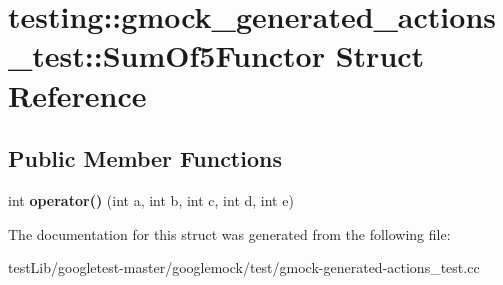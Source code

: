 \hypertarget{structtesting_1_1gmock__generated__actions__test_1_1SumOf5Functor}{}\section{testing\+:\+:gmock\+\_\+generated\+\_\+actions\+\_\+test\+:\+:Sum\+Of5\+Functor Struct Reference}
\label{structtesting_1_1gmock__generated__actions__test_1_1SumOf5Functor}
\subsection*{Public Member Functions}
\begin{DoxyCompactItemize}
\item 
\mbox{\label{structtesting_1_1gmock__generated__actions__test_1_1SumOf5Functor_aa3d751efb237e12ecdf1528f2b73da04}} 
int {\bfseries operator()} (int a, int b, int c, int d, int e)
\end{DoxyCompactItemize}


The documentation for this struct was generated from the following file\+:\begin{DoxyCompactItemize}
\item 
test\+Lib/googletest-\/master/googlemock/test/gmock-\/generated-\/actions\+\_\+test.\+cc\end{DoxyCompactItemize}
